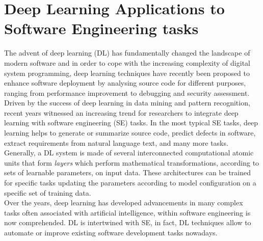 \chapter{Deep Learning Applications to Software Engineering tasks}
The advent of deep learning (DL) has fundamentally changed the landscape of modern software and in order to cope with 
the increasing complexity of digital system programming, deep learning techniques have recently been proposed 
to enhance software deployment by analysing source code for different purposes, ranging from performance improvement 
to debugging and security assessment. Driven by the success of deep learning in data mining and pattern 
recognition, recent years witnessed an increasing trend for researchers to integrate deep learning with software engineering (SE) 
tasks. In the most typical SE tasks, deep learning helps to generate or summarize source code, predict defects in software, extract requirements from natural language text, 
and many more tasks.
Generally, a DL system is made of several interconnected computational atomic units that form \textit{layers}
which perform mathematical transformations, according to sets of learnable parameters, on input data. These architectures
can be trained for specific tasks updating the parameters according to model configuration on a specific set of training data. \\ Over the years, 
deep learning has developed advancements in many complex tasks often associated with artificial intelligence, within software engineering 
is now comprehended. DL is intertwined with SE, in fact, DL techniques allow to automate or improve existing software 
development tasks nowadays. 

